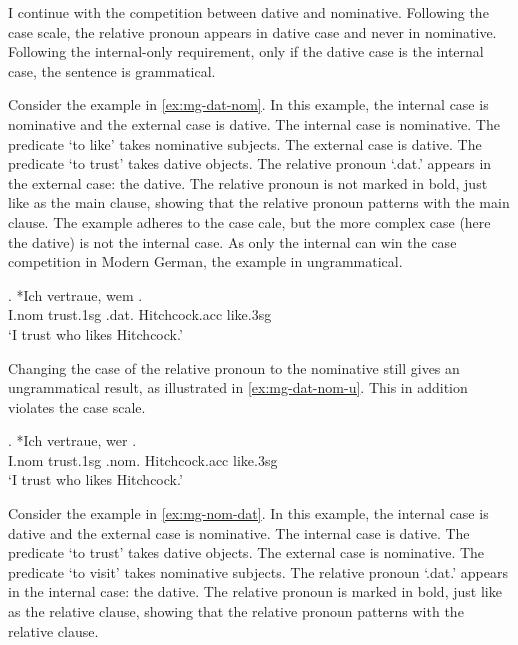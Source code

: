 I continue with the competition between dative and nominative. Following the case scale, the relative pronoun appears in dative case and never in nominative. Following the internal-only requirement, only if the dative case is the internal case, the sentence is grammatical.

Consider the example in \ref{ex:mg-dat-nom}. In this example, the internal case is nominative and the external case is dative.
The internal case is nominative. The predicate  `to like' takes nominative subjects.
The external case is dative. The predicate  `to trust' takes dative objects.
The relative pronoun  `.\ac{dat}.' appears in the external case: the dative. The relative pronoun is not marked in bold, just like as the main clause, showing that the relative pronoun patterns with the main clause.
The example adheres to the case cale, but the more complex case (here the dative) is not the internal case. As only the internal can win the case competition in Modern German, the example in ungrammatical.

\exg. *Ich vertraue, wem  .\\
I.\ac{nom} trust.1\ac{sg}\scsub{[dat]} .\ac{dat}. Hitchcock.\ac{acc} like.3\ac{sg}\scsub{[nom]}\\
`I trust who likes Hitchcock.' \label{ex:mg-dat-nom}

Changing the case of the relative pronoun to the nominative still gives an ungrammatical result, as illustrated in \ref{ex:mg-dat-nom-u}. This in addition violates the case scale.

\exg. *Ich vertraue, wer  .\\
I.\ac{nom} trust.1\ac{sg}\scsub{[dat]} .\ac{nom}. Hitchcock.\ac{acc} like.3\ac{sg}\scsub{[nom]}\\
`I trust who likes Hitchcock.' \label{ex:mg-dat-nom-u}

Consider the example in \ref{ex:mg-nom-dat}. In this example, the internal case is dative and the external case is nominative.
The internal case is dative. The predicate  `to trust' takes dative objects.
The external case is nominative. The predicate  `to visit' takes nominative subjects.
The relative pronoun  `.\ac{dat}.' appears in the internal case: the dative. The relative pronoun is marked in bold, just like as the relative clause, showing that the relative pronoun patterns with the relative clause.

